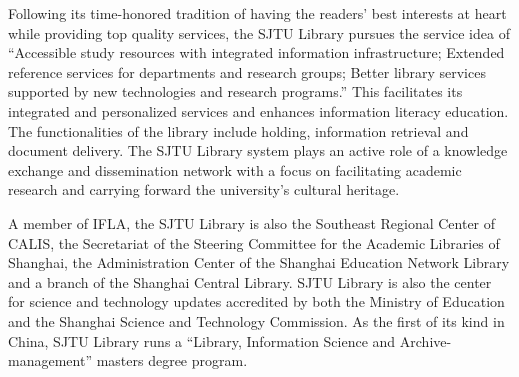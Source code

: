 \begin{bigabstract}
Following its time-honored tradition of having the readers’ best interests at heart while providing top quality services, the SJTU Library pursues the service idea of “Accessible study resources with integrated information infrastructure; Extended reference services for departments and research groups; Better library services supported by new technologies and research programs.” This facilitates its integrated and personalized services and enhances information literacy education. The functionalities of the library include holding, information retrieval and document delivery. The SJTU Library system plays an active role of a knowledge exchange and dissemination network with a focus on facilitating academic research and carrying forward the university’s cultural heritage.

A member of IFLA, the SJTU Library is also the Southeast Regional Center of CALIS, the Secretariat of the Steering Committee for the Academic Libraries of Shanghai, the Administration Center of the Shanghai Education Network Library and a branch of the Shanghai Central Library. SJTU Library is also the center for science and technology updates accredited by both the Ministry of Education and the Shanghai Science and Technology Commission. As the first of its kind in China, SJTU Library runs a “Library, Information Science and Archive-management” masters degree program.

\end{bigabstract}
